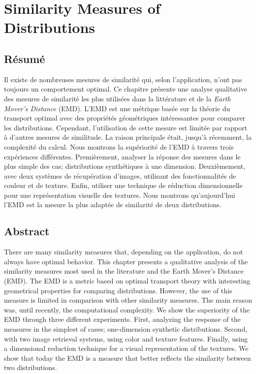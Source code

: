 
\chapter{Similarity Measures of Distributions}\label{ch:similarity_measures}


\section*{Résumé}
\noindent Il existe de nombreuses mesures de similarité qui, selon l'application, n'ont pas toujours un comportement optimal. Ce chapitre présente une analyse qualitative des mesures de similarité les plus utilisées dans la littérature et de la \textit{Earth Mover's Distance} (EMD). L'EMD est une métrique basée sur la théorie du transport optimal avec des propriétés géométriques intéressantes pour comparer les distributions. Cependant, l'utilisation de cette mesure est limitée par rapport à d'autres mesures de similitude. La raison principale était, jusqu'à récemment, la complexité du calcul. Nous montrons la supériorité de l'EMD à travers trois expériences différentes. Premièrement, analyser la réponse des mesures dans le plus simple des cas; distributions synthétiques à une dimension. Deuxièmement, avec deux systèmes de récupération d'images, utilisant des fonctionnalités de couleur et de texture. Enfin, utiliser une technique de réduction dimensionnelle pour une représentation visuelle des textures. Nous montrons qu'aujourd'hui l'EMD est la mesure la plus adaptée de similarité de deux distributions.

\section*{Abstract}
\noindent There are many similarity measures that, depending on the application, do not always have optimal behavior. This chapter presents a qualitative analysis of the similarity measures most used in the literature and the Earth Mover's Distance (EMD). The EMD is a metric based on optimal transport theory with interesting geometrical properties for comparing distributions. However, the use of this measure is limited in comparison with other similarity measures. The main reason was, until recently, the computational complexity. We show the superiority of the EMD through three different experiments. First, analyzing the response of the measures in the simplest of cases; one-dimension synthetic distributions. Second, with two image retrieval systems, using color and texture features. Finally, using a dimensional reduction technique for a visual representation of the textures. We show that today the EMD is a measure that better reflects the similarity between two distributions.

